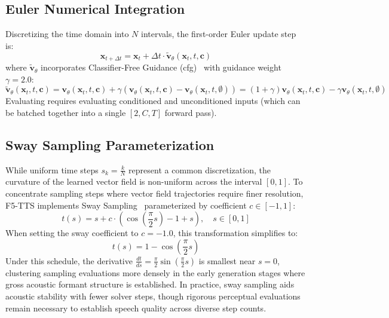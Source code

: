 \subsection{Euler Numerical Integration}
Discretizing the time domain into $N$ intervals, the first-order Euler update step is:
\begin{equation}
    \mathbf{x}_{t + \Delta t} = \mathbf{x}_t + \Delta t \cdot \tilde{\mathbf{v}}_\theta(\mathbf{x}_t, t, \mathbf{c})
    \label{eq:euler_update}
\end{equation}
where $\tilde{\mathbf{v}}_\theta$ incorporates Classifier-Free Guidance (\acrshort{cfg})~\cite{ho2022cfg} with guidance weight $\gamma = 2.0$:
\begin{equation}
    \tilde{\mathbf{v}}_\theta(\mathbf{x}_t, t, \mathbf{c}) = \mathbf{v}_\theta(\mathbf{x}_t, t, \mathbf{c}) + \gamma \left( \mathbf{v}_\theta(\mathbf{x}_t, t, \mathbf{c}) - \mathbf{v}_\theta(\mathbf{x}_t, t, \emptyset) \right) = (1 + \gamma) \mathbf{v}_\theta(\mathbf{x}_t, t, \mathbf{c}) - \gamma \mathbf{v}_\theta(\mathbf{x}_t, t, \emptyset)
    \label{eq:cfg_formula}
\end{equation}
Evaluating  requires evaluating conditioned and unconditioned inputs (which can be batched together into a single $[2, C, T]$ forward pass).

\subsection{Sway Sampling Parameterization}
While uniform time steps $s_k = \frac{k}{N}$ represent a common discretization, the curvature of the learned vector field is non-uniform across the interval $[0, 1]$. To concentrate sampling steps where vector field trajectories require finer resolution, F5-TTS implements Sway Sampling~\cite{chen2024f5tts} parameterized by coefficient $c \in [-1, 1]$:
\begin{equation}
    t(s) = s + c \cdot \left( \cos\left(\frac{\pi}{2} s\right) - 1 + s \right), \quad s \in [0, 1]
    \label{eq:sway_formula}
\end{equation}
When setting the sway coefficient to $c = -1.0$, this transformation simplifies to:
\begin{equation}
    t(s) = 1 - \cos\left(\frac{\pi}{2} s\right)
    \label{eq:sway_simplified}
\end{equation}
Under this schedule, the derivative $\frac{dt}{ds} = \frac{\pi}{2} \sin\left(\frac{\pi}{2} s\right)$ is smallest near $s = 0$, clustering sampling evaluations more densely in the early generation stages where gross acoustic formant structure is established. In practice, sway sampling aids acoustic stability with fewer solver steps, though rigorous perceptual evaluations remain necessary to establish speech quality across diverse step counts.

